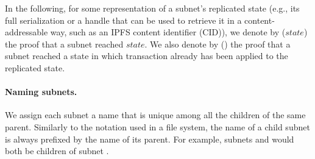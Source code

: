 In the following, for some representation of a subnet's replicated state (e.g., its full serialization or a handle that can be used to retrieve it in a content-addressable way, such as an IPFS content identifier (CID)),
we denote by {\pof}($state$) the proof that a subnet reached $state$.
%
We also denote by {\pof}() the proof that a subnet reached a state in which transaction  already has been applied to the replicated state.

\paragraph{Naming subnets.}
We assign each subnet a name that is unique among all the children of the same parent.
Similarly to the notation used in a file system, the name of a child subnet is always prefixed by the name of its parent.
For example, subnets  and  would both be children of subnet .

